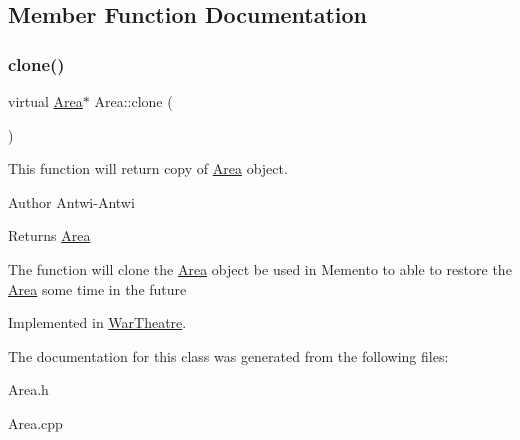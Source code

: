 \subsection{Member Function Documentation}
\mbox{\label{classArea_a383d61c76b8fac66ef903036d776a3a4}} 
\subsubsection{\texorpdfstring{clone()}{clone()}}
{\footnotesize\ttfamily virtual \hyperlink{classArea}{Area}$\ast$ Area\+::clone (\begin{DoxyParamCaption}{ }\end{DoxyParamCaption})\hspace{0.3cm}{\ttfamily [pure virtual]}}



This function will return copy of \hyperlink{classArea}{Area} object. 

\begin{DoxyAuthor}{Author}
Antwi-\/\+Antwi
\end{DoxyAuthor}
\begin{DoxyReturn}{Returns}
\hyperlink{classArea}{Area}
\end{DoxyReturn}
The function will clone the \hyperlink{classArea}{Area} object be used in Memento to able to restore the \hyperlink{classArea}{Area} some time in the future 

Implemented in \hyperlink{classWarTheatre_a501f851edf6f5ad00770414e50505175}{War\+Theatre}.



The documentation for this class was generated from the following files\+:\begin{DoxyCompactItemize}
\item 
Area.\+h\item 
Area.\+cpp\end{DoxyCompactItemize}
